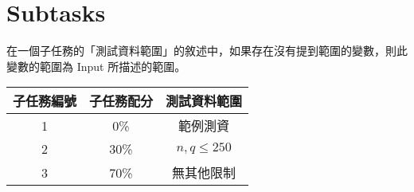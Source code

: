 \documentclass[11pt,a4paper]{article}
\begin{document}
\section*{Subtasks}

在一個子任務的「測試資料範圍」的敘述中，如果存在沒有提到範圍的變數，則此變數的範圍為 Input 所描述的範圍。

\begin{center}
 \begin{tabular}{||c c c||} 
 \hline
 子任務編號 & 子任務配分 & 測試資料範圍 \\  
 \hline
 \hline
 1 & 0\% & 範例測資 \\ 
 \hline
 2 & 30\% & $n, q\le 250$\\
 \hline 
 3 & 70\% & 無其他限制 \\
 \hline

\end{tabular}
\end{center}
\end{document}
